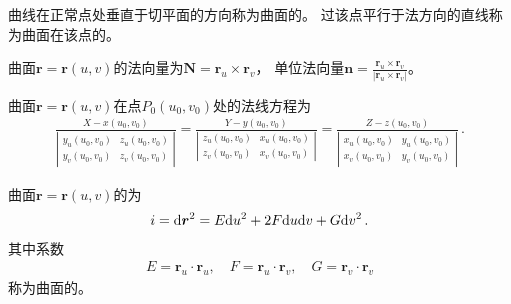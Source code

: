 \begin{definition}
    曲线在正常点处垂直于切平面的方向称为曲面的。
    过该点平行于法方向的直线称为曲面在该点的。
\end{definition}
\begin{corollary}
    曲面$\bm r=\bm r(u,v)$的法向量为$\displaystyle\bm N=\bm r_u\times\bm r_v$，
    单位法向量$\bm n=\displaystyle\frac{\bm r_u\times\bm r_v}{|\bm r_u\times\bm r_v|}$。
\end{corollary}
\begin{corollary}
    曲面$\bm r=\bm r(u,v)$在点$P_0(u_0,v_0)$处的法线方程为
    \begin{align}\label{eq:03ex01.17}
        \frac{X-x(u_0,v_0)}{\left|
            \begin{array}{cc}
                y_u(u_0,v_0) & z_u(u_0,v_0) \\
                y_v(u_0,v_0) & z_v(u_0,v_0)
            \end{array}
            \right|}=\frac{Y-y(u_0,v_0)}{\left|
            \begin{array}{cc}
                z_u(u_0,v_0) & x_u(u_0,v_0) \\
                z_v(u_0,v_0) & x_v(u_0,v_0)
            \end{array}
            \right|}=\frac{Z-z(u_0,v_0)}{\left|
            \begin{array}{cc}
                x_u(u_0,v_0) & y_u(u_0,v_0) \\
                x_v(u_0,v_0) & y_v(u_0,v_0)
            \end{array}
            \right|}\, .
    \end{align}
\end{corollary}

\begin{definition}
    曲面$\bm r=\bm r(u,v)$的为
    \begin{align}\label{eq:03ex01.18}
        \uppercase\expandafter{\romannumeral1}=\mathrm{d}\bm r^2=E\mathrm{d}u^2+2F\mathrm{d}u\mathrm{d}v+G\mathrm{d}v^2\, .
    \end{align}
    其中系数
    \begin{align}\label{eq:03ex01.19}
        E=\bm r_u\cdot\bm r_u,\quad F=\bm r_u\cdot\bm r_v,\quad G=\bm r_v\cdot\bm r_v
    \end{align}
    称为曲面的。
\end{definition}

